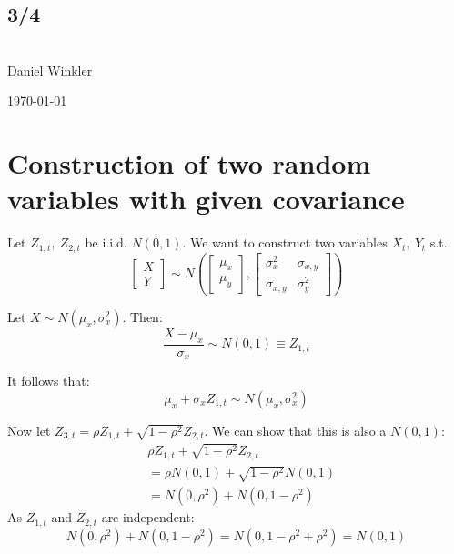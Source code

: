 \documentclass[11pt]{article}
\begin{document}
\thispagestyle{empty}
\begin{center}
  \section*{3/4} %
  \textbf{}\\
  \large{Daniel Winkler}
  
  {\large \today\par}
\end{center}

\section{Construction of two random variables with given covariance}
\label{sec:constr-two-rand}



Let $Z_{1,t},\ Z_{2,t}$ be i.i.d. $N(0,1)$. We want to construct two variables $X_t,\ Y_t$ s.t.
\begin{equation}
  \label{eq:1}
  \begin{bmatrix}
    X\\
    Y
  \end{bmatrix} \sim
  N \left(
    \begin{bmatrix}
      \mu_x\\
      \mu_y
    \end{bmatrix},
    \begin{bmatrix}
      \sigma^2_x & \sigma_{x,y}\\
      \sigma_{x,y} & \sigma_y^2
    \end{bmatrix}
\right)
\end{equation}

Let $X \sim N(\mu_x, \sigma^2_x)$. Then:
\begin{equation}
  \label{eq:2}
  \frac{X-\mu_x}{\sigma_x} \sim N(0,1) \equiv Z_{1,t}
\end{equation}

It follows that:
\begin{equation}
  \label{eq:3}
  \mu_x + \sigma_x Z_{1,t} \sim N(\mu_x, \sigma^2_x)
\end{equation}

Now let $Z_{3,t} = \rho Z_{1,t} + \sqrt{1-\rho^2} Z_{2,t}$. We can show that this is also a $N(0,1)$:
\begin{equation}
  \label{eq:4}
  \begin{split}
    &\rho Z_{1,t} + \sqrt{1-\rho^2} Z_{2,t}\\
    &=\rho N(0,1) + \sqrt{1-\rho^2} N(0,1)\\
    &=N(0,\rho^2) + N(0, 1-\rho^2)
  \end{split}
\end{equation}
As $Z_{1,t}$ and $Z_{2,t}$ are independent:
\begin{equation}
  \label{eq:5}
    N(0,\rho^2) + N(0, 1-\rho^2) = N(0,1-\rho^2+\rho^2) = N(0,1)
\end{equation}
\end{document}
